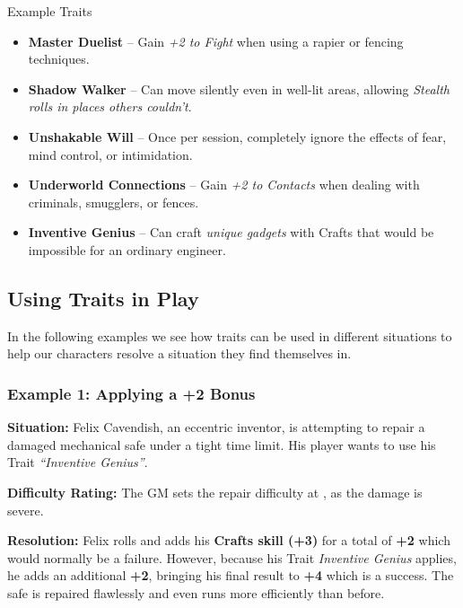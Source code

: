 \begin{DndSidebar}[float=!t]{Example Traits}
    \begin{itemize}
        \item \textbf{Master Duelist} – Gain \emph{+2 to Fight} when using a rapier or fencing techniques.
        \item \textbf{Shadow Walker} – Can move silently even in well-lit areas, allowing \emph{Stealth rolls in places others couldn’t}.
        \item \textbf{Unshakable Will} – Once per session, completely ignore the effects of fear, mind control, or intimidation.
        \item \textbf{Underworld Connections} – Gain \emph{+2 to Contacts} when dealing with criminals, smugglers, or fences.
        \item \textbf{Inventive Genius} – Can craft \emph{unique gadgets} with Crafts that would be impossible for an ordinary engineer.
    \end{itemize}
\end{DndSidebar}

\subsection{Using Traits in Play}

In the following examples we see how traits can be used in different situations to help our characters resolve a situation they find themselves in.



\begin{DndReadAloud}{}
	\subsubsection{Example 1: Applying a +2 Bonus}
	\textbf{Situation:} Felix Cavendish, an eccentric inventor, is attempting to repair a damaged mechanical safe under a tight time limit. His player wants to use his Trait \emph{“Inventive Genius”}.

	\noindent\textbf{Difficulty Rating:} The GM sets the repair difficulty at \Arduous, as the damage is severe.

    \noindent\textbf{Resolution:} Felix rolls  and adds his \textbf{Crafts skill (+3)} for a total of \textbf{+2} which would normally be a failure. However, because his Trait \emph{Inventive Genius} applies, he adds an additional \textbf{+2}, bringing his final result to \textbf{+4} which is a success. The safe is repaired flawlessly and even runs more efficiently than before.
\end{DndReadAloud}


